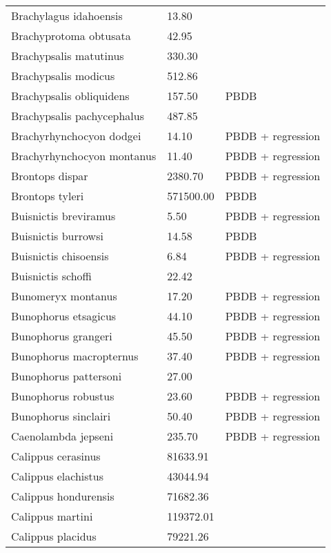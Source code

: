 \begin{longtable}{p{} p{} p{}}
    Brachylagus idahoensis & 13.80 & \cite{Smith2004} \\ 
    Brachyprotoma obtusata & 42.95 & \cite{Tomiya2013} \\ 
    Brachypsalis matutinus & 330.30 & \cite{Tomiya2013} \\ 
    Brachypsalis modicus & 512.86 & \cite{Tomiya2013} \\ 
    Brachypsalis obliquidens & 157.50 & PBDB \\ 
    Brachypsalis pachycephalus & 487.85 & \cite{Tomiya2013} \\ 
    Brachyrhynchocyon dodgei & 14.10 & PBDB + regression \\ 
    Brachyrhynchocyon montanus & 11.40 & PBDB + regression \\ 
    Brontops dispar & 2380.70 & PBDB + regression \\ 
    Brontops tyleri & 571500.00 & PBDB \\ 
    Buisnictis breviramus & 5.50 & PBDB + regression \\ 
    Buisnictis burrowsi & 14.58 & PBDB \\ 
    Buisnictis chisoensis & 6.84 & PBDB + regression \\ 
    Buisnictis schoffi & 22.42 & \cite{Tomiya2013} \\ 
    Bunomeryx montanus & 17.20 & PBDB + regression \\ 
    Bunophorus etsagicus & 44.10 & PBDB + regression \\ 
    Bunophorus grangeri & 45.50 & PBDB + regression \\ 
    Bunophorus macropternus & 37.40 & PBDB + regression \\ 
    Bunophorus pattersoni & 27.00 & \cite{Macdonald1956} \\ 
    Bunophorus robustus & 23.60 & PBDB + regression \\ 
    Bunophorus sinclairi & 50.40 & PBDB + regression \\ 
    Caenolambda jepseni & 235.70 & PBDB + regression \\ 
    Calippus cerasinus & 81633.91 & \cite{Tomiya2013} \\ 
    Calippus elachistus & 43044.94 & \cite{Tomiya2013} \\ 
    Calippus hondurensis & 71682.36 & \cite{Tomiya2013} \\ 
    Calippus martini & 119372.01 & \cite{Tomiya2013} \\ 
    Calippus placidus & 79221.26 & \cite{Tomiya2013} \\ 

\end{longtable}
